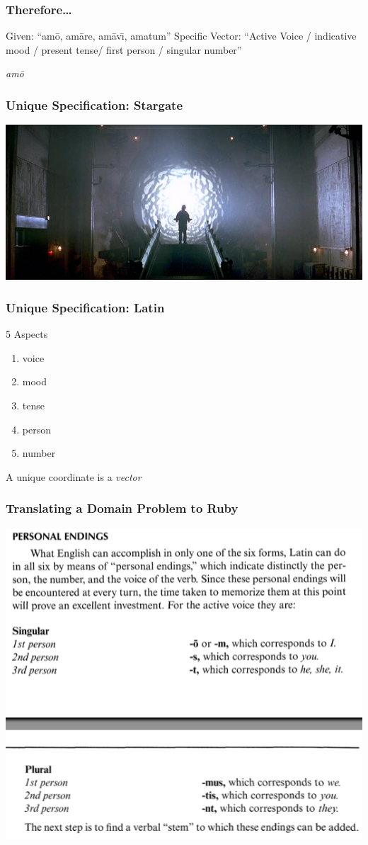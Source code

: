 \documentclass[slidestop,compress,mathserif,notes]{beamer}
\begin{document}
\begin{frame}
	\frametitle{Therefore\ldots}
	Given:  ``am\={o}, am\={a}re, am\={a}v\={\i}, amatum''
	\vskip 0.5cm
	Specific Vector: ``Active Voice / indicative mood / present tense/ first person / singular number'' 
	\vskip 0.5cm
	\begin{center}
		\emph{am\={o}}
	\end{center}
\end{frame}

\begin{frame}
	\frametitle{Unique Specification:  Stargate}
	\includegraphics[scale=0.25]{img/stargate.jpg}
	\vskip 0.5cm
\end{frame}

\begin{frame}
	\frametitle{Unique Specification:  Latin}
	5 Aspects
	\begin{enumerate}
		\item voice
		\pause
		\item mood
		\pause
		\item tense
		\pause
		\item person
		\pause
		\item number
		\pause
	\end{enumerate}
	\vskip 0.5cm
	A unique coordinate is a \emph{vector}
\end{frame}

\begin{frame}
	\frametitle{Translating a Domain Problem to Ruby} 
	\includegraphics[scale=0.45]{img/conj_how_1.png}
\end{frame}
\end{document}
